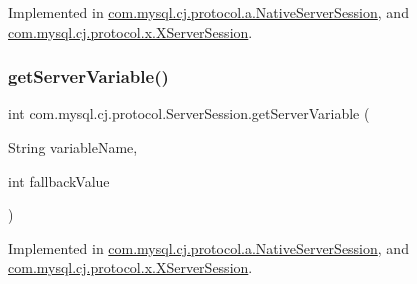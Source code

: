 Implemented in \mbox{\hyperlink{classcom_1_1mysql_1_1cj_1_1protocol_1_1a_1_1_native_server_session_ac4c00989ffc6de351aa574fb6cc4a24b}{com.\+mysql.\+cj.\+protocol.\+a.\+Native\+Server\+Session}}, and \mbox{\hyperlink{classcom_1_1mysql_1_1cj_1_1protocol_1_1x_1_1_x_server_session_a3e6841daa14568f979bc90c9a48e1daf}{com.\+mysql.\+cj.\+protocol.\+x.\+X\+Server\+Session}}.

\mbox{\label{interfacecom_1_1mysql_1_1cj_1_1protocol_1_1_server_session_afeb21bb0efebb37bf03081dc2febfa6b}} 
\subsubsection{\texorpdfstring{get\+Server\+Variable()}{getServerVariable()}\hspace{0.1cm}{\footnotesize\ttfamily [2/2]}}
{\footnotesize\ttfamily int com.\+mysql.\+cj.\+protocol.\+Server\+Session.\+get\+Server\+Variable (\begin{DoxyParamCaption}\item[{String}]{variable\+Name,  }\item[{int}]{fallback\+Value }\end{DoxyParamCaption})}



Implemented in \mbox{\hyperlink{classcom_1_1mysql_1_1cj_1_1protocol_1_1a_1_1_native_server_session_a1073d8d9d87cbae4427770f6a33825f5}{com.\+mysql.\+cj.\+protocol.\+a.\+Native\+Server\+Session}}, and \mbox{\hyperlink{classcom_1_1mysql_1_1cj_1_1protocol_1_1x_1_1_x_server_session_a71b98c34fcfe39e2a7ef2d9143f3e309}{com.\+mysql.\+cj.\+protocol.\+x.\+X\+Server\+Session}}.

\mbox{\label{interfacecom_1_1mysql_1_1cj_1_1protocol_1_1_server_session_a0bd7485d9c76e0183247def27942a209}} 
